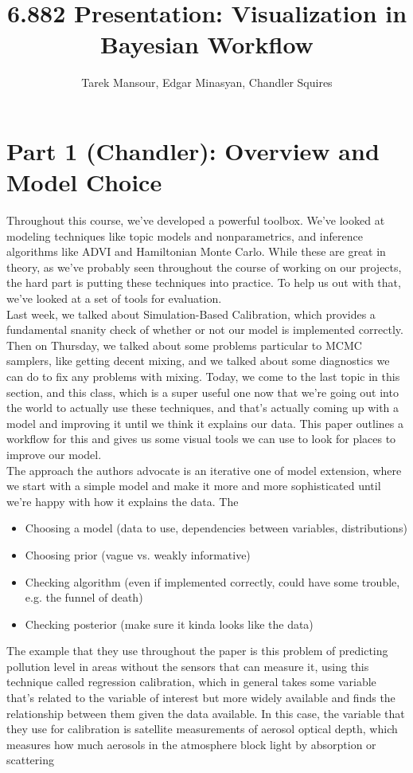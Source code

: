 \documentclass[]{article}
\title{6.882 Presentation: Visualization in Bayesian Workflow}
\author{Tarek Mansour, Edgar Minasyan, Chandler Squires}
\date{}
\begin{document}
\maketitle
\thispagestyle{empty}

\section*{Part 1 (Chandler): Overview and Model Choice}

Throughout this course, we've developed a powerful toolbox. We've looked at modeling techniques like topic models and nonparametrics, and inference algorithms like ADVI and Hamiltonian Monte Carlo. While these are great in theory, as we've probably seen throughout the course of working on our projects, the hard part is putting these techniques into practice. To help us out with that, we've looked at a set of tools for evaluation.
\\

Last week, we talked about Simulation-Based Calibration, which provides a fundamental snanity check of whether or not our model is implemented correctly. Then on Thursday, we talked about some problems particular to MCMC samplers, like getting decent mixing, and we talked about some diagnostics we can do to fix any problems with mixing. Today, we come to the last topic in this section, and this class, which is a super useful one now that we're going out into the world to actually use these techniques, and that's actually coming up with a model and improving it until we think it explains our data. This paper outlines a workflow for this and gives us some visual tools we can use to look for places to improve our model.
\\

The approach the authors advocate is an iterative one of model extension, where we start with a simple model and make it more and more sophisticated until we're happy with how it explains the data. The 
\begin{itemize}
	\item Choosing a model (data to use, dependencies between variables, distributions)
	\item Choosing prior (vague vs. weakly informative)
	\item Checking algorithm (even if implemented correctly, could have some trouble, e.g. the funnel of death)
	\item Checking posterior (make sure it kinda looks like the data)
\end{itemize}

The example that they use throughout the paper is this problem of predicting pollution level in areas without the sensors that can measure it, using this technique called regression calibration, which in general takes some variable that's related to the variable of interest but more widely available and finds the relationship between them given the data available. In this case, the variable that they use for calibration is satellite measurements of aerosol optical depth, which measures how much aerosols in the atmosphere block light by absorption or scattering
\end{document}
